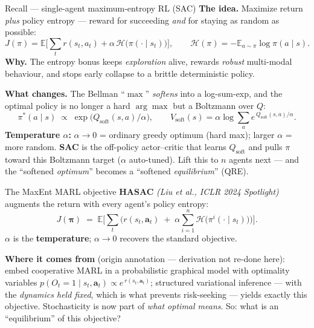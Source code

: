 \documentclass[10pt, aspectratio=169]{beamer}
\newcommand{\paper}[1]{\textcolor{mLightBrown}{\small\textit{(#1)}}}
\begin{document}
\begin{frame}{Recall --- single-agent maximum-entropy RL (SAC)}
\small
\textbf{The idea.} Maximize return \emph{plus} policy entropy --- reward for succeeding \emph{and} for staying as random as possible:
\[
J(\pi) = \mathbb{E}\Big[ \textstyle\sum_t r(s_t,a_t) + \alpha\,\mathcal{H}\big(\pi(\cdot\mid s_t)\big) \Big], \qquad \mathcal{H}(\pi)= -\mathbb{E}_{a\sim\pi}\log\pi(a\mid s).
\]
\textbf{Why.} The entropy bonus keeps \emph{exploration} alive, rewards \emph{robust} multi-modal behaviour, and stops early collapse to a brittle deterministic policy.
\medskip

\pause
\textbf{What changes.} The Bellman ``$\max$'' \emph{softens} into a log-sum-exp, and the optimal policy is no longer a hard $\arg\max$ but a \alert{Boltzmann} over $Q$:
\[
\pi^*(a\mid s) \;\propto\; \exp\!\big( Q_{\text{soft}}(s,a)/\alpha \big), \qquad V_{\text{soft}}(s) = \alpha \log\!\textstyle\sum_a e^{\,Q_{\text{soft}}(s,a)/\alpha}.
\]
\textbf{Temperature $\alpha$:} $\alpha\!\to\!0$ = ordinary greedy optimum (hard max); larger $\alpha$ = more random. \textbf{SAC} is the off-policy actor--critic that learns $Q_{\text{soft}}$ and pulls $\pi$ toward this Boltzmann target ($\alpha$ auto-tuned).
\medskip
\pause
{\footnotesize\textcolor{mLightBrown}{Lift this to $n$ agents next --- and the ``softened \emph{optimum}'' becomes a ``softened \emph{equilibrium}'' (QRE).}}
\end{frame}

\begin{frame}{The MaxEnt MARL objective}
\textbf{HASAC} \paper{Liu et al., ICLR 2024 Spotlight} \; augments the return with every agent's policy entropy:
\[
J(\bm\pi) \;=\; \mathbb{E}\Big[ \sum_{t} \Big( r(s_t,\mathbf{a}_t) \;+\; \alpha \sum_{i=1}^{n} \mathcal{H}\big(\pi^i(\cdot\mid s_t)\big) \Big) \Big].
\]
$\alpha$ is the \textbf{temperature}; \; $\alpha \to 0$ recovers the standard objective.
\medskip

\pause
\textbf{Where it comes from} {\footnotesize\textcolor{mLightBrown}{(origin annotation --- derivation not re-done here)}}: embed cooperative MARL in a probabilistic graphical model with optimality variables $p(O_t = 1 \mid s_t,\mathbf{a}_t) \propto e^{\,r(s_t,\mathbf{a}_t)}$; structured variational inference --- with the \emph{dynamics held fixed}, which is what prevents risk-seeking --- yields exactly this objective.
\medskip
\pause
Stochasticity is now part of \emph{what optimal means}. So: what is an ``equilibrium'' of this objective?
\end{frame}
\end{document}
